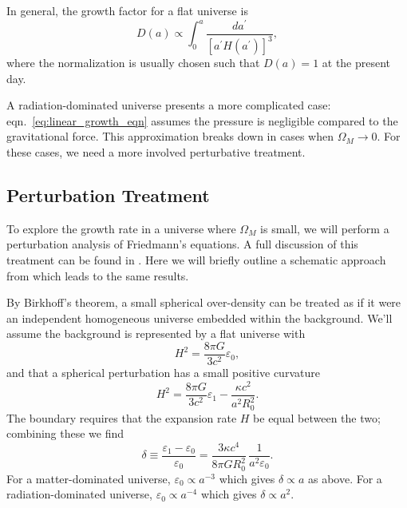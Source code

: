 In general, the growth factor for a flat universe is
\begin{equation}
  \label{eq:linear_growth}
  D(a) \propto \int_0^a \frac{da^\prime}{[a^\prime H(a^\prime)]^3},
\end{equation}
where the normalization is usually chosen such that $D(a) = 1$ at the
present day.

A radiation-dominated universe presents a more complicated case:
eqn.~\ref{eq:linear_growth_eqn} assumes the pressure is negligible compared
to the gravitational force.  This approximation breaks down in
cases when $\Omega_M \to 0$.  For these cases, we need a more involved
perturbative treatment.

\subsection{Perturbation Treatment}
To explore the growth rate in a universe where $\Omega_M$ is small, we
will perform a perturbation analysis of Friedmann's equations.
A full discussion of this treatment can be found in
\citet{peebles1993principles}.
Here we will briefly outline a schematic approach from \citet{kolb_turner}
which leads to the same results.

By Birkhoff's theorem, a small spherical over-density can be treated as if
it were an independent homogeneous universe embedded within the background.
We'll assume the background is represented by a flat universe with
\begin{equation}
  H^2 = \frac{8\pi G}{3c^2}\varepsilon_0,
\end{equation}
and that a spherical perturbation has a small positive curvature
\begin{equation}
  H^2 = \frac{8\pi G}{3c^2}\varepsilon_1 - \frac{\kappa c^2}{a^2R_0^2}.
\end{equation}
The boundary requires that the expansion rate $H$ be equal between the
two; combining these we find
\begin{equation}
  \delta \equiv \frac{\varepsilon_1 - \varepsilon_0}{\varepsilon_0}
  = \frac{3\kappa c^4}{8\pi G R_0^2}\,\frac{1}{a^2 \varepsilon_0}.
\end{equation}
For a matter-dominated universe, $\varepsilon_0 \propto a^{-3}$
which gives $\delta \propto a$ as above.
For a radiation-dominated universe, $\varepsilon_0 \propto a^{-4}$
which gives $\delta \propto a^2$.

